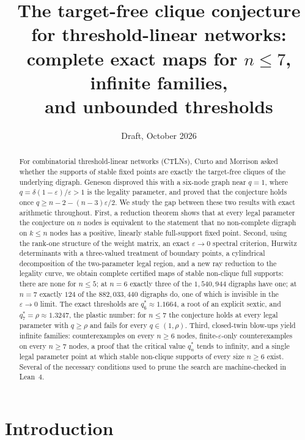 \documentclass[11pt]{article}
\title{The target-free clique conjecture for threshold-linear networks:\\
complete exact maps for $n\le 7$, infinite families,\\ and unbounded thresholds}
\author{}
\date{Draft, October 2026}
\theoremstyle{definition}
\newcommand{\eps}{\varepsilon}
\begin{document}
\maketitle

\begin{abstract}
For combinatorial threshold-linear networks (CTLNs), Curto and Morrison asked whether the supports of
stable fixed points are exactly the target-free cliques of the underlying digraph. Geneson disproved this
with a six-node graph near $q=1$, where $q=\delta(1-\eps)/\eps>1$ is the legality parameter, and proved
that the conjecture holds once $q\ge n-2-(n-3)\eps/2$. We study the gap between these two results
with exact arithmetic throughout. First, a reduction theorem shows that at every legal parameter the
conjecture on $n$ nodes is equivalent to the statement that no non-complete digraph on $k\le n$ nodes
has a positive, linearly stable full-support fixed point. Second, using the rank-one structure of the
weight matrix, an exact $\eps\to0$ spectral criterion, Hurwitz determinants with a three-valued
treatment of boundary points, a cylindrical decomposition of the two-parameter legal region, and a
new ray reduction to the legality curve, we obtain complete certified maps of stable non-clique full
supports: there are none for $n\le5$; at $n=6$ exactly three of the $1{,}540{,}944$ digraphs have one; at
$n=7$ exactly $124$ of the $882{,}033{,}440$ digraphs do, one of which is invisible in the $\eps\to0$ limit. The exact
thresholds are $q_6^*\approx1.1664$, a root of an explicit sextic, and $q_7^*=\rho\approx1.3247$, the
plastic number: for $n\le7$ the conjecture holds at every legal parameter with $q\ge\rho$ and fails for
every $q\in(1,\rho)$. Third, closed-twin blow-ups yield infinite families: counterexamples on every
$n\ge6$ nodes, finite-$\eps$-only counterexamples on every $n\ge7$ nodes, a proof that the critical
value $q_n^*$ tends to infinity, and a single legal parameter point at which stable non-clique supports
of every size $n\ge 6$ exist. Several of the necessary conditions used to prune the search are
machine-checked in Lean~4.
\end{abstract}

\section{Introduction}\label{sec:intro}
\end{document}

